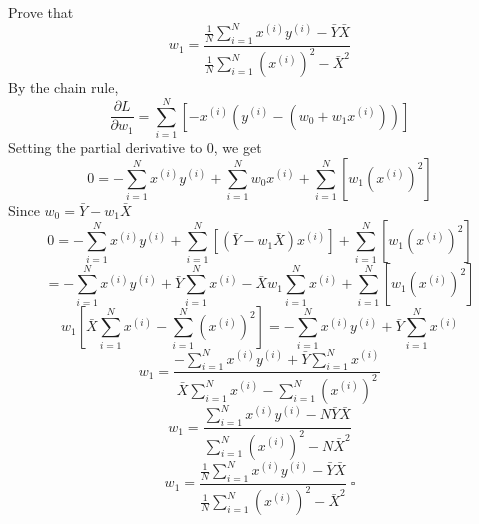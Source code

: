 \documentclass[12 pt]{article}        	%
\begin{document}
Prove that 
\begin{displaymath}
  w_1 = \frac{\frac{1}{N}\sum_{i=1}^{N}x^{(i)}y^{(i)}-\bar{Y}\bar{X}}{\frac{1}{N}\sum_{i=1}^{N}(x^{(i)})^2-\bar{X}^2}
\end{displaymath}
By the chain rule, 
\begin{displaymath}
  \frac{\partial L}{\partial w_1} = \sum_{i=1}^{N}[ -x^{(i)} ( y^{(i)} - (w_0 + w_1 x^{(i)}) ) ]
\end{displaymath}
Setting the partial derivative to 0, we get
\begin{displaymath}
  0 = -\sum_{i=1}^{N}x^{(i)}y^{(i)} + \sum_{i=1}^{N}w_0 x^{(i)} + \sum_{i=1}^{N}[w_1 (x^{(i)})^2]
\end{displaymath}
Since $ w_0 = \bar{Y}-w_1\bar{X} $
\begin{displaymath}
  0 = -\sum_{i=1}^{N}x^{(i)}y^{(i)} + \sum_{i=1}^{N} [ (\bar{Y}-w_1\bar{X}) x^{(i)} ] + \sum_{i=1}^{N}[w_1 (x^{(i)})^2]
\end{displaymath}
\begin{displaymath}
  = -\sum_{i=1}^{N}x^{(i)}y^{(i)} + \bar{Y} \sum_{i=1}^{N} x^{(i)} - \bar{X} w_1 \sum_{i=1}^{N} x^{(i)} + \sum_{i=1}^{N}[w_1 (x^{(i)})^2]
\end{displaymath}
\begin{displaymath}
  w_1 [ \bar{X} \sum_{i=1}^{N} x^{(i)} - \sum_{i=1}^{N}(x^{(i)})^2 ] 
  = -\sum_{i=1}^{N}x^{(i)}y^{(i)} + \bar{Y} \sum_{i=1}^{N} x^{(i)} 
\end{displaymath}
\begin{displaymath}
  w_1 = \frac{ -\sum_{i=1}^{N}x^{(i)}y^{(i)} + \bar{Y} \sum_{i=1}^{N} x^{(i)} } 
  { \bar{X} \sum_{i=1}^{N} x^{(i)} - \sum_{i=1}^{N}(x^{(i)})^2 } 
\end{displaymath}
\begin{displaymath}
  w_1 = \frac{ \sum_{i=1}^{N}x^{(i)}y^{(i)} - N \bar{Y} \bar{X} } 
  { \sum_{i=1}^{N}(x^{(i)})^2 - N \bar{X}^2 } 
\end{displaymath}
\begin{displaymath}
  w_1 = \frac{ \frac{1}{N} \sum_{i=1}^{N}x^{(i)}y^{(i)} - \bar{Y} \bar{X} } 
  { \frac{1}{N} \sum_{i=1}^{N}(x^{(i)})^2 - \bar{X}^2 } \; \square
\end{displaymath} \\ \\
\end{document}
